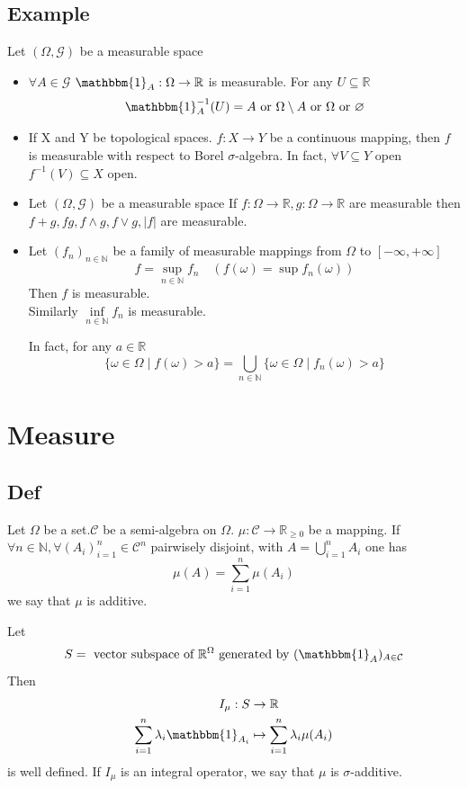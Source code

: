 \documentclass{book}
\newcommand{\abs}[1]{\left\lvert #1 \right\rvert}
\begin{document}
\section{Example}
Let $(\Omega,\mathcal{G})$ be a measurable space
\begin{itemize}
    \item $\forall A\in \mathcal{G}$ $\mathbbm{1}_A:\Omega\rightarrow\mathbb{R}$ is measurable.
    For any $U\subseteq\mathbb{R}$$$\mathbbm{1}^{-1}_A(U)=A\text{ or }\Omega\setminus A\text{ or }\Omega \text{ or } \varnothing$$
    \item If X and Y be topological spaces. $f:X\rightarrow Y$ be a continuous mapping, then $f$ is measurable with respect to Borel $\sigma$-algebra. In fact, $\forall V\subseteq Y$ open $f^{-1}(V)\subseteq X$ open.
    \item Let $(\Omega,\mathcal{G})$ be a measurable space If $f:\Omega\rightarrow\mathbb{R},g:\Omega\rightarrow\mathbb{R}$ are measurable then $f+g,fg,f\wedge g,f\vee g,\abs{f}$ are measurable.
    \item Let $(f_n)_{n\in \mathbb{N}}$ be a family of measurable mappings from $\Omega$ to $[-\infty,+\infty]$$$f=\sup\limits_{n\in \mathbb{N}}f_n\quad(f(\omega)=\sup f_n(\omega))$$
    Then $f$ is measurable.\\
    Similarly $\inf\limits_{n\in \mathbb{N}}f_n$ is measurable.
    
    In fact, for any $a\in \mathbb{R}$$$\{\omega\in \Omega\mid f(\omega)>a\}=\bigcup\limits_{n\in \mathbb{N}}\{\omega\in \Omega\mid f_n(\omega)>a\}$$
\end{itemize}
\chapter{Measure}
\section{Def}
Let $\Omega$ be a set.$\mathcal{C}$ be a semi-algebra on $\Omega$. $\mu:\mathcal{C}\rightarrow\mathbb{R}_{\geq0}$ be a mapping. If $\forall n\in \mathbb{N},\forall (A_i)_{i=1}^n\in \mathcal{C}^n$ pairwisely disjoint, with $A=\bigcup\limits_{i=1}^nA_i$ one has$$\mu(A)=\sum\limits_{i=1}^n\mu(A_i)$$we say that $\mu$ is additive.

Let $$S=\text{ vector subspace of }\mathbb{R}^\Omega\text{ generated by } (\mathbbm{1}_A)_{A\in \mathcal{C}}$$Then$$\begin{aligned}
    I_\mu:S&\rightarrow\mathbb{R}\\ \sum\limits_{i=1}^n\lambda_i\mathbbm{1}_{A_i}&\mapsto \sum\limits_{i=1}^n\lambda_i\mu(A_i)
\end{aligned}$$
is well defined. If $I_\mu$ is an integral operator, we say that $\mu$ is $\sigma$-additive.
\end{document}
